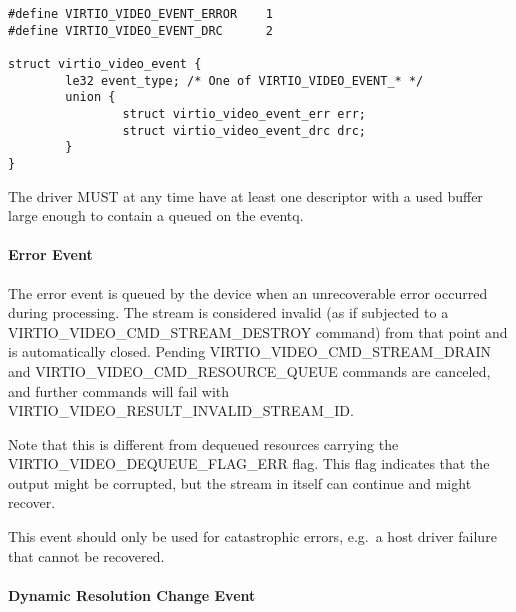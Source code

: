 \begin{lstlisting}
#define VIRTIO_VIDEO_EVENT_ERROR    1
#define VIRTIO_VIDEO_EVENT_DRC      2

struct virtio_video_event {
        le32 event_type; /* One of VIRTIO_VIDEO_EVENT_* */
        union {
                struct virtio_video_event_err err;
                struct virtio_video_event_drc drc;
        }
}
\end{lstlisting}


The driver MUST at any time have at least one descriptor with a used
buffer large enough to contain a 
queued on the eventq.

\paragraph{Error Event}\label{sec:Device Types / Video Device / Device Operation / Device Operation: Event Virtqueue / Error Event}

The error event is queued by the device when an unrecoverable error
occurred during processing. The stream is considered invalid (as if
subjected to a VIRTIO\_VIDEO\_CMD\_STREAM\_DESTROY command) from that
point and is automatically closed. Pending
VIRTIO\_VIDEO\_CMD\_STREAM\_DRAIN and
VIRTIO\_VIDEO\_CMD\_RESOURCE\_QUEUE commands are canceled, and further
commands will fail with VIRTIO\_VIDEO\_RESULT\_INVALID\_STREAM\_ID.

Note that this is different from dequeued resources carrying the
VIRTIO\_VIDEO\_DEQUEUE\_FLAG\_ERR flag. This flag indicates that the
output might be corrupted, but the stream in itself can continue and
might recover.

This event should only be used for catastrophic errors, e.g.~a host
driver failure that cannot be recovered.

\paragraph{Dynamic Resolution Change Event}\label{sec:Device Types / Video Device / Device Operation / Device Operation: Event Virtqueue / Dynamic Resolution Change Event}


